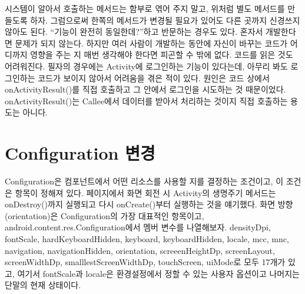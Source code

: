 시스템이 알아서 호출하는 메서드는 함부로 엮어 주지 말고, 위처럼 별도 메서드를 만들도록 하자. 그럼으로써 한쪽의 메서드가 변경될 필요가 있어도 다른 곳까지 신경쓰지 않아도 된다.
``기능이 완전히 동일한데?''하고 반문하는 경우도 있다. 혼자서 개발한다면 문제가 되지 않는다. 하지만 여러 사람이 개발하는 동안에 자신이 바꾸는 코드가 어디까지 영향을 주는 지 매번 생각해야 한다면 피곤할 수 밖에 없다. 
코드를 읽은 것도 어려워진다. 
필자의 경우에는 Activity에 로그인하는 기능이 있다는데, 아무리 봐도 로그인하는 코드가 보이지 않아서 어려움을 겪은 적이 있다. 
원인은 코드 상에서 onActivityResult()를 직접 호출하고 그 안에서 로그인을 시도하는 것 때문이었다. onActivityResult()는 Callee에서 데이터를 받아서 처리하는 것이지 직접 호출하는 용도는 아니다.

\section{Configuration 변경}
Configuration은 컴포넌트에서 어떤 리소스를 사용할 지를 결정하는 조건이고, 이 조건은 항목이 정해져 있다. 
\pageref{flow}페이지에서 화면 회전 시 Activity의 생명주기 메서드는 onDestroy()까지 실행되고 다시 onCreate()부터 실행하는 것을 얘기했다. 
화면 방향(orientation)은 Configuration의 가장 대표적인 항목이고, 
android.content.res.Configuration에서 멤버 변수를 나열해보자. 
densityDpi,
fontScale,
hardKeyboardHidden,
keyboard,
keyboardHidden,
locale,
mcc,
mnc, 
navigation, 
navigationHidden,
orientation,
screeenHeightDp,
screenLayout, 
screenWidthDp,
smalllestScreenWidthDp,
touchScreen,
uiMode로 모두 17개가 있고, 
여기서 fontScale과 locale은 환경설정에서 정할 수 있는 사용자 옵션이고 나머지는 단말의 현재 상태이다.\\

